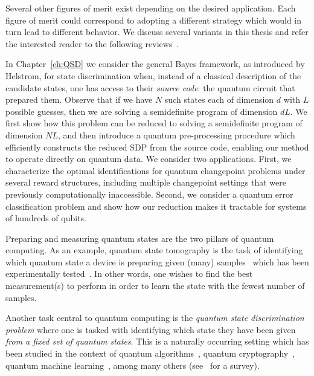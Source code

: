 Several other figures of merit exist depending on the desired application.
Each figure of merit could correspond to adopting a different strategy which would in turn lead to different behavior.  
We discuss several variants in this thesis and refer the interested reader to the following reviews~\cite{chefles1998quantum, chefles2000quantum, bergou2004discrimination, bergou2007quantum, barnett2009quantum, bergou2010discrimination, Bae_2015}. 

In Chapter~\ref{ch:QSD} we consider the general Bayes framework, as introduced by Helstrom, for state discrimination when, instead of a classical description of the candidate states, one has access to their \emph{source code}: the quantum circuit that prepared them.
Observe that if we have $N$ such states each of dimension $d$ with $L$ possible guesses, then we are solving a semidefinite program of dimension $d L$.
We first show how this problem can be reduced to solving a semidefinite program of dimension $N L$, and then introduce a quantum pre-processing procedure which efficiently constructs the reduced SDP from the source code, enabling our method to operate directly on quantum data.
We consider two applications.
First, we characterize the optimal identifications for quantum changepoint problems under several reward structures, including multiple changepoint settings that were previously computationally inaccessible.
Second, we consider a quantum error classification problem and show how our reduction makes it tractable for systems of hundreds of qubits.


Preparing and measuring quantum states are the two pillars of quantum computing. 
As an example, quantum state tomography is the task of identifying which quantum state a device is preparing given (many) samples~\cite{christandl2012reliable, torlai2018neural, gross2010quantum, qi2013quantum, ahmed2021quantum, mahler2013adaptive, schwemmer2015systematic}
which has been experimentally tested~\cite{cramer2010efficient, stricker2022experimental, rambach2021robust, rippe2008experimental, mallet2011quantum}. 
In other words, one wishes to find the best measurement(s) to perform in order to learn the state with the fewest number of samples.

Another task central to quantum computing is the \emph{quantum state discrimination problem} where one is tasked with identifying which state they have been given \emph{from a fixed set of quantum states}. 
This is a naturally occurring setting which has been studied in the context of quantum algorithms~\cite{radhakrishnan2009random, hayashi2006quantum}, quantum cryptography~\cite{van2002unambiguous, cabello2000quantum, ambainis2001new, sikora2017simple}, quantum machine learning~\cite{sentis2016quantum, sentis2017exact}, among many others (see~\cite{Bae_2015} for a survey).

